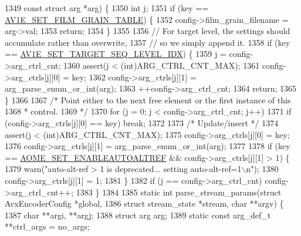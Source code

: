\begin{DoxyCodeInclude}
{{{{{{{{{{{{{{{{1349                                  \textcolor{keyword}{const} \textcolor{keyword}{struct} arg *arg) \{
1350   \textcolor{keywordtype}{int} j;
1351   \textcolor{keywordflow}{if} (key == \hyperlink{group__aom__encoder_ggae78dde67a6d78f332e9bdba0dde42db5ad5846c6f49d37e65a03c39e68d487097}{AV1E\_SET\_FILM\_GRAIN\_TABLE}) \{
1352     config->film\_grain\_filename = arg->val;
1353     \textcolor{keywordflow}{return};
1354   \}
1355 
1356   \textcolor{comment}{// For target level, the settings should accumulate rather than overwrite,}
1357   \textcolor{comment}{// so we simply append it.}
1358   \textcolor{keywordflow}{if} (key == \hyperlink{group__aom__encoder_ggae78dde67a6d78f332e9bdba0dde42db5abc032ee5a8dc3f51ab88b64737590f1b}{AV1E\_SET\_TARGET\_SEQ\_LEVEL\_IDX}) \{
1359     j = config->arg\_ctrl\_cnt;
1360     assert(j < (\textcolor{keywordtype}{int})ARG\_CTRL\_CNT\_MAX);
1361     config->arg\_ctrls[j][0] = key;
1362     config->arg\_ctrls[j][1] = arg\_parse\_enum\_or\_int(arg);
1363     ++config->arg\_ctrl\_cnt;
1364     \textcolor{keywordflow}{return};
1365   \}
1366 
1367   \textcolor{comment}{/* Point either to the next free element or the first instance of this}
1368 \textcolor{comment}{   * control.}
1369 \textcolor{comment}{   */}
1370   \textcolor{keywordflow}{for} (j = 0; j < config->arg\_ctrl\_cnt; j++)
1371     \textcolor{keywordflow}{if} (config->arg\_ctrls[j][0] == key) \textcolor{keywordflow}{break};
1372 
1373   \textcolor{comment}{/* Update/insert */}
1374   assert(j < (\textcolor{keywordtype}{int})ARG\_CTRL\_CNT\_MAX);
1375   config->arg\_ctrls[j][0] = key;
1376   config->arg\_ctrls[j][1] = arg\_parse\_enum\_or\_int(arg);
1377 
1378   \textcolor{keywordflow}{if} (key == \hyperlink{group__aom__encoder_ggae78dde67a6d78f332e9bdba0dde42db5ac8a24393f214823f5a6bd345afb840b6}{AOME\_SET\_ENABLEAUTOALTREF} && config->arg\_ctrls[j][1] > 1) \{
1379     warn(\textcolor{stringliteral}{"auto-alt-ref > 1 is deprecated... setting auto-alt-ref=1\(\backslash\)n"});
1380     config->arg\_ctrls[j][1] = 1;
1381   \}
1382   \textcolor{keywordflow}{if} (j == config->arg\_ctrl\_cnt) config->arg\_ctrl\_cnt++;
1383 \}
1384 
1385 \textcolor{keyword}{static} \textcolor{keywordtype}{int} parse\_stream\_params(\textcolor{keyword}{struct} AvxEncoderConfig *global,
1386                                \textcolor{keyword}{struct} stream\_state *stream, \textcolor{keywordtype}{char} **argv) \{
1387   \textcolor{keywordtype}{char} **argi, **argj;
1388   \textcolor{keyword}{struct }arg arg;
1389   \textcolor{keyword}{static} \textcolor{keyword}{const} arg\_def\_t **ctrl\_args = no\_args;
}}}}}}}}}}}}}}}}
\end{DoxyCodeInclude}
